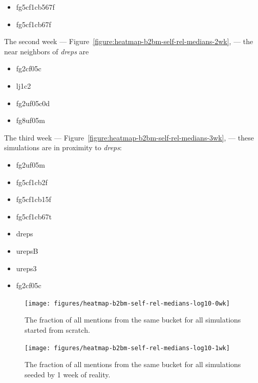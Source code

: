 \documentclass[10pt,oneside]{memoir}
\begin{document}
\begin{Spacing}{2}
\begin{itemize}
\item fg5cf1cb567f

\item fg5cf1cb67f
\end{itemize}

The second week --- Figure~\ref{figure:heatmap-b2bm-self-rel-medians-2wk}, --- the near neighbors of {\itshape dreps} are


\begin{itemize}


\item fg2cf05c

\item lj1c2

\item fg2uf05c0d

\item fg8uf05m
\end{itemize}

The third week --- Figure~\ref{figure:heatmap-b2bm-self-rel-medians-3wk}, --- these simulations are in proximity to {\itshape dreps}:


\begin{itemize}


\item fg2uf05m

\item fg5cf1cb2f

\item fg5cf1cb15f

\item fg5cf1cb67t

\item dreps

\item urepsB

\item ureps3

\item fg2cf05c
\end{itemize}


\begin{figure}
\begin{center}
    \texttt{[image: figures/heatmap-b2bm-self-rel-medians-log10-0wk]}
    \caption{The fraction of all mentions from the same bucket for all simulations started from scratch.}
    \label{figure:heatmap-b2bm-self-rel-medians-0wk}
\end{center}
\end{figure}

\begin{figure}
\begin{center}
    \texttt{[image: figures/heatmap-b2bm-self-rel-medians-log10-1wk]}
    \caption{The fraction of all mentions from the same bucket for all simulations seeded by 1 week of reality.}
    \label{figure:heatmap-b2bm-self-rel-medians-1wk}
\end{center}
\end{figure}


\end{Spacing}
\end{document}
